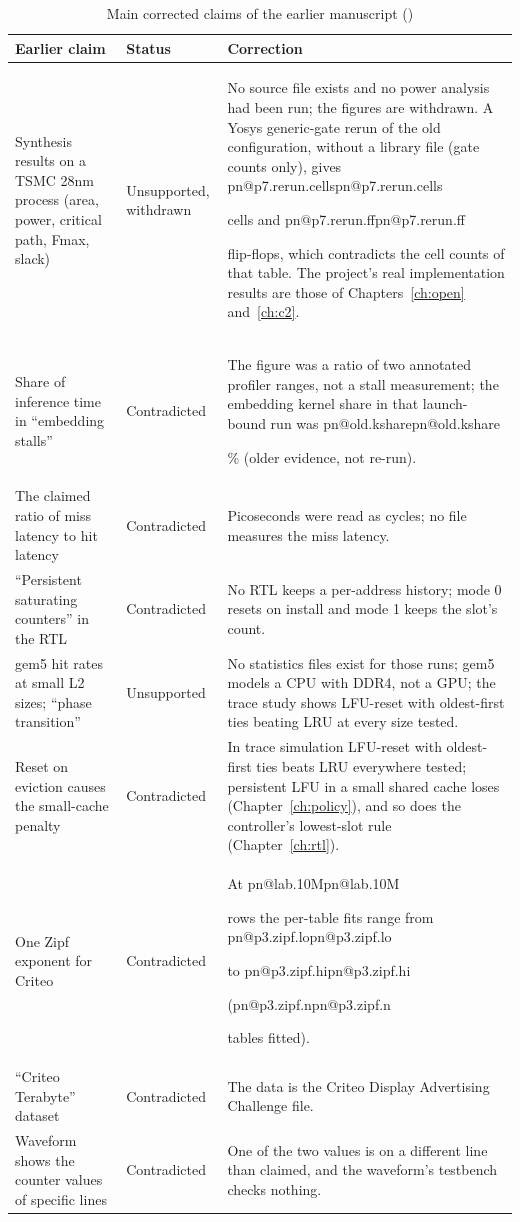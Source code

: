 \documentclass[11pt,a4paper]{report}
\makeatletter
\DeclareRobustCommand{\R}[1]{\ifcsname pn@#1\endcsname\csname pn@#1\endcsname\else
  \PackageError{report}{number key '#1' is not defined in macros.tex}{Run tools/make_paper_macros.py --target report}\fi}
\newcommand{\withdrawn}[1]{#1}
\makeatother
\begin{document}
\begin{table}[ht]
\centering
\caption{Main corrected claims of the earlier manuscript (\protect{})}
\label{tab:corr}
\small
\begin{tabularx}{\textwidth}{@{}>{\raggedright\arraybackslash}p{}>{\raggedright\arraybackslash}p{}L@{}}
\toprule
Earlier claim & Status & Correction \\
\midrule
\withdrawn{Synthesis results on a TSMC 28nm process (area, power, critical path, Fmax, slack)} & Unsupported,
withdrawn & No source file exists and no power analysis had been run; the figures are withdrawn. A Yosys generic-gate rerun of the old configuration, without a library file (gate counts only), gives \R{p7.rerun.cells} cells and \R{p7.rerun.ff} flip-flops, which contradicts the cell counts of
that table. The project's real implementation results are those of Chapters~\ref{ch:open} and~\ref{ch:c2}. \\
Share of inference time in ``embedding stalls'' & Contradicted & The figure was a ratio of two annotated profiler
ranges, not a stall measurement; the embedding kernel share in that launch-bound run was \R{old.kshare}\% (older
evidence, not re-run). \\
The claimed ratio of miss latency to hit latency & Contradicted & Picoseconds were read as cycles; no file measures the miss latency. \\
``Persistent saturating counters'' in the RTL & Contradicted & No RTL keeps a per-address history; mode 0 resets on
install and mode 1 keeps the slot's count. \\
gem5 hit rates at small L2 sizes; ``phase transition'' & Unsupported & No statistics files exist for those runs; gem5 models a CPU with DDR4, not a GPU; the trace study shows LFU-reset with oldest-first ties beating LRU at every size tested. \\
Reset on eviction causes the small-cache penalty & Contradicted & In trace simulation LFU-reset with oldest-first ties beats LRU everywhere tested; persistent LFU in a small shared cache loses (Chapter~\ref{ch:policy}), and so does the controller's lowest-slot rule (Chapter~\ref{ch:rtl}). \\
One Zipf exponent for Criteo & Contradicted & At \R{lab.10M} rows the per-table fits range from \R{p3.zipf.lo} to \R{p3.zipf.hi} (\R{p3.zipf.n} tables fitted). \\
``Criteo Terabyte'' dataset & Contradicted & The data is the Criteo Display Advertising Challenge file. \\
Waveform shows the counter values of specific lines & Contradicted & One of the two values is on a different line than claimed, and the waveform's testbench checks nothing. \\
\bottomrule
\end{tabularx}
\end{table}
\end{document}
